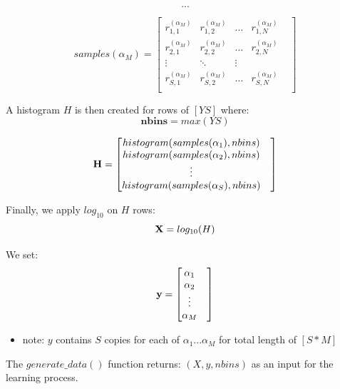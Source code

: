 \documentclass[a4paper, 12pt]{report}
\begin{document}
\[
...
\]

\[
samples(\alpha_M) = \begin{bmatrix} 
    r^{(\alpha_M)}_{1,1} & r^{(\alpha_M)}_{1,2} & \dots & r^{(\alpha_M)}_{1,N} & \\
    r^{(\alpha_M)}_{2,1} & r^{(\alpha_M)}_{2,2} & \dots & r^{(\alpha_M)}_{2,N} & \\
    \vdots & \ddots & \vdots & \\
    r^{(\alpha_M)}_{S,1} & r^{(\alpha_M)}_{S,2} & \dots & r^{(\alpha_M)}_{S,N} & \\
\end{bmatrix}
\]

\par A histogram $H$ is then created for rows of $[YS]$ where: 
\begin{equation}
\label{eq:2}
\textbf {nbins} = max(YS)
\end{equation}

\[
{\textbf H} = \begin{bmatrix} 
    histogram(samples(\alpha_1), nbins) & \\
    histogram(samples(\alpha_2), nbins) & \\
    \vdots & \\
    histogram(samples(\alpha_S), nbins) & \\
\end{bmatrix}
\]

\par Finally, we apply $log_{10}$ on $H$ rows:
\begin{equation}
\label{eq:3}
    {\textbf X} = log_{10}(H)
\end{equation}

We set:
\begin{equation}
\label{eq:4}
{\textbf y} = \begin{bmatrix} 
    \alpha_1 & \\
    \alpha_2 & \\
    \vdots & \\
    \alpha_M & \\
\end{bmatrix}
\end{equation}

\begin{itemize}
  \item note: $y$ contains $S$ copies for each of $\alpha_1...\alpha_M$ for total length of $[S*M]$
\end{itemize}

\par The $generate\_data()$ function returns: $(X, y, nbins)$ as an input for the learning process.
\end{document}
